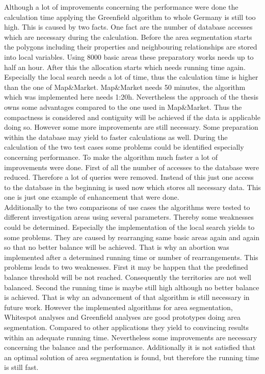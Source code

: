Although a lot of improvements concerning the performance were done the calculation time applying the Greenfield algorithm to whole Germany is still too high. This is caused by two facts. One fact are the number of database accesses which are necessary during the calculation. Before the area segmentation starts the polygons including their properties and neighbouring relationships are stored into local variables. Using 8000 basic areas these preparatory works needs up to half an hour. After this the allocation starts which needs running time again. Especially the local search needs a lot of time, thus the calculation time is higher than the one of Map\&Market. Map\&Market needs 50 minutes, the algorithm which was implemented here needs 1:20h. Nevertheless the approach of the thesis owns some advantages compared to the one used in Map\&Market. Thus the compactness is considered and contiguity will be achieved if the data is applicable doing so. However some more improvements are still necessary. Some preparation within the database may yield to faster calculations as well. During the calculation of the two test cases some problems could be identified especially concerning performance. To make the algorithm much faster a lot of improvements were done. First of all the number of accesses to the database were reduced. Therefore a lot of queries were removed. Instead of this just one access to the database in the beginning is used now which stores all necessary data. This one is just one example of enhancement that were done. \\
Additionally to the two comparisons of use cases the algorithms were tested to different investigation areas using several parameters. Thereby some weaknesses could be determined. Especially the implementation of the local search yields to some problems. They are caused by rearranging same basic areas again and again so that no better balance will be achieved. That is why an abortion was implemented after a determined running time or number of rearrangements. This problems leads to two weaknesses. First it may be happen that the predefined balance threshold will be not reached. Consequently the territories are not well balanced. Second the running time is maybe still high although no better balance is achieved. That is why an advancement of that algorithm is still necessary in future work. However the implemented algorithms for area segmentation, Whitespot analyses and Greenfield analyses are good prototypes doing area segmentation. Compared to other applications they yield to convincing results within an adequate running time. Nevertheless some improvements are necessary concerning the balance and the performance. Additionally it is not satisfied that an optimal solution of area segmentation is found, but therefore the running time is still fast. 

